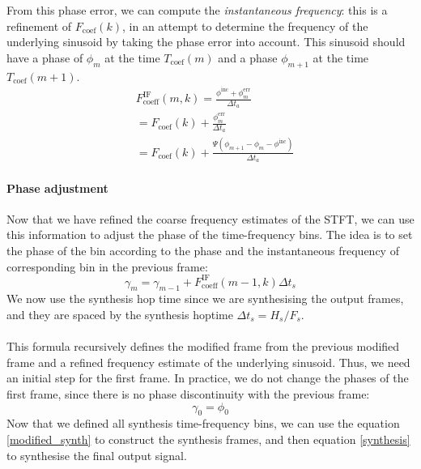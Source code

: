 \documentclass[letterpaper]{article}
\theoremstyle{definition}
\theoremstyle{remark}
\begin{document}
From this phase error, we can compute the \emph{instantaneous frequency}: this
is a refinement of \(F_{\text{coef}}(k)\), in an attempt to determine the
frequency of the underlying sinusoid by taking the phase error into account.
This sinusoid should have a phase of
\(\phi_m\) at the time \(T_{\text{coef}}(m)\) and a phase \(\phi_{m+1}\) at
the time \(T_{\text{coef}}(m+1)\).
\begin{align}
	&F_{\text{coeff}}^{\text{IF}}(m,k)=\frac{\phi^{\text{inc}} + \phi^{\text{err}}_m}{\Delta t_a}\\
	&=F_{\text{coef}}(k) + \frac{\phi^{\text{err}}_m}{\Delta t_a}\\
	&=F_{\text{coef}}(k) + \frac{\Psi(\phi_{m+1} - \phi_m - \phi^{\text{inc}})}{\Delta t_a}
\end{align}

\paragraph{Phase adjustment}
Now that we have refined the coarse frequency estimates of the STFT, we can use
this information to adjust the phase of the time-frequency bins. The idea is to
set the phase of the bin according to the phase and the instantaneous frequency
of corresponding bin in the previous frame:
\begin{equation}
	\gamma_m=\gamma_{m-1} + F_{\text{coeff}}^{\text{IF}}(m-1,k)\Delta t_s
\end{equation}
We now use the synthesis hop time since we are synthesising the output frames,
and they are spaced by the synthesis hoptime \(\Delta t_s=H_s/F_s\).

\paragraph{}
This formula recursively defines the modified frame from the previous modified
frame and a refined frequency estimate of the underlying sinusoid. Thus, we
need an initial step for the first frame. In practice, we do not change the
phases of the first frame, since there is no phase discontinuity with the
previous frame:
\begin{equation}
	\label{initial_phase}
	\gamma_0=\phi_0
\end{equation}
Now that we defined all synthesis time-frequency bins, we can use the equation
\eqref{modified_synth} to construct the synthesis frames, and then equation
\eqref{synthesis} to synthesise the final output signal.
\end{document}
